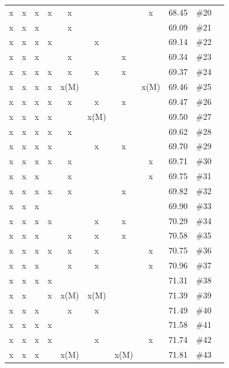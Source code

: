 \begin{table}[H]
{\begin{tabular}{c c c c c c c c c c c}
 x    & x    & x    & x    & x    &      &      & x    & 68.45 & \#20 \\
 x    & x    & x    &      & x    &      &      &      & 69.09 & \#21 \\
 x    & x    & x    & x    &      & x    &      &      & 69.14 & \#22 \\
 x    & x    & x    &      & x    &      & x    &      & 69.34 & \#23 \\
 x    & x    & x    & x    & x    & x    & x    &      & 69.37 & \#24 \\
 x    & x    & x    & x    & x(M) &      &      & x(M) & 69.46 & \#25 \\
 x    & x    & x    & x    & x    & x    & x    &      & 69.47 & \#26 \\
 x    & x    & x    & x    &      & x(M) &      &      & 69.50 & \#27 \\
 x    & x    & x    & x    & x    &      &      &      & 69.62 & \#28 \\
 x    & x    & x    & x    &      & x    & x    &      & 69.70 & \#29 \\
 x    & x    & x    & x    & x    &      &      & x    & 69.71 & \#30 \\
 x    & x    & x    &      & x    &      &      & x    & 69.75 & \#31 \\
 x    & x    & x    & x    & x    &      & x    &      & 69.82 & \#32 \\
 x    & x    & x    &      &      &      &      &      & 69.90 & \#33 \\
 x    & x    & x    & x    &      & x    & x    &      & 70.29 & \#34 \\
 x    & x    & x    &      & x    & x    & x    &      & 70.58 & \#35 \\
 x    & x    & x    & x    & x    & x    &      & x    & 70.75 & \#36 \\
 x    & x    & x    &      & x    & x    &      & x    & 70.96 & \#37 \\
 x    & x    & x    & x    &      &      &      &      & 71.31 & \#38 \\
 x    & x    &      & x    & x(M) & x(M) &      &      & 71.39 & \#39 \\
 x    & x    & x    &      & x    & x    &      &      & 71.49 & \#40 \\
 x    & x    & x    & x    &      &      &      &      & 71.58 & \#41 \\
 x    & x    & x    & x    &      & x    &      & x    & 71.74 & \#42 \\
 x    & x    & x    &      & x(M) &      & x(M) &      & 71.81 & \#43 \\

\end{tabular}}
\end{table}
